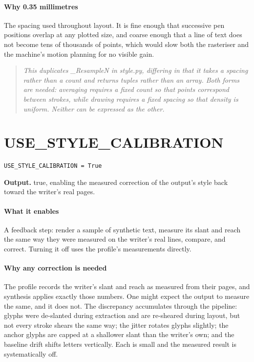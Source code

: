 \paragraph{Why 0.35 millimetres}
The spacing used throughout layout. It is fine enough that successive pen positions overlap at any plotted size, and coarse enough that a line of text does not become tens of thousands of points, which would slow both the rasteriser and the machine's motion planning for no visible gain.


\begin{quote}\small\itshape This duplicates \_ResampleN in style.py, differing in that it takes a spacing rather than a count and returns tuples rather than an array. Both forms are needed: averaging requires a fixed count so that points correspond between strokes, while drawing requires a fixed spacing so that density is uniform. Neither can be expressed as the other.\end{quote}

\section{USE\_STYLE\_CALIBRATION}
\begin{lstlisting}[style=sig]
USE_STYLE_CALIBRATION = True
\end{lstlisting}

\noindent\textbf{Output.} true, enabling the measured correction of the output's style back toward the writer's real pages.


\paragraph{What it enables}
A feedback step: render a sample of synthetic text, measure its slant and reach the same way they were measured on the writer's real lines, compare, and correct. Turning it off uses the profile's measurements directly.


\paragraph{Why any correction is needed}
The profile records the writer's slant and reach as measured from their pages, and synthesis applies exactly those numbers. One might expect the output to measure the same, and it does not. The discrepancy accumulates through the pipeline: glyphs were de-slanted during extraction and are re-sheared during layout, but not every stroke shears the same way; the jitter rotates glyphs slightly; the anchor glyphs are capped at a shallower slant than the writer's own; and the baseline drift shifts letters vertically. Each is small and the measured result is systematically off.

